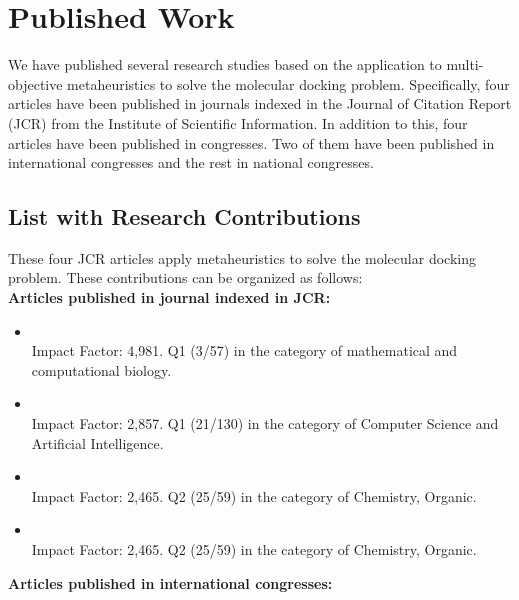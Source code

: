 \chapter{Published Work}
\label{chapter:publishedWorks}

We have published several research studies based on the application to multi-objective metaheuristics to solve the molecular docking problem. Specifically, four articles have been published in journals indexed in the Journal of Citation Report (JCR) from the Institute of Scientific Information. In addition to this, four articles have been published in congresses. Two of them have been published in international congresses and the rest in national congresses.

\section{List with Research Contributions}

These four JCR articles apply metaheuristics to solve the molecular docking problem. These contributions can be organized as follows:\\

\noindent \textbf{Articles published in journal indexed in JCR:}

\begin{itemize}[leftmargin=5.5mm]
	
	\item {}\\Impact Factor: 4,981. Q1 (3/57)  in the category of mathematical and computational biology.
	
	\item {}\\Impact Factor: 2,857. Q1 (21/130) in the category of Computer Science and Artificial Intelligence.
	
	\item {}\\Impact Factor: 2,465. Q2 (25/59) in the category of Chemistry, Organic.
	
	\item {}\\Impact Factor: 2,465. Q2 (25/59) in the category of Chemistry, Organic.
	
\end{itemize}

\noindent \textbf{Articles published in international congresses:}

